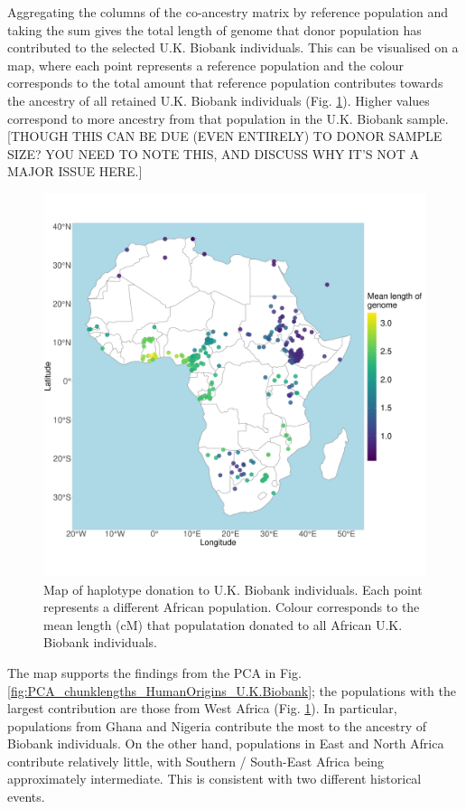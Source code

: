 {Aggregating the columns of the co-ancestry matrix by reference population and taking the sum gives the total length of genome that donor population has contributed to the selected U.K. Biobank individuals. This can be visualised on a map, where each point represents a reference population and the colour corresponds to the total amount that reference population contributes towards the ancestry of all retained U.K. Biobank individuals (Fig. \ref{fig:haplotype_sharing_map_zoomed_II}). Higher values correspond to more ancestry from that population in the U.K. Biobank sample.{\color{red}[THOUGH THIS CAN BE DUE (EVEN ENTIRELY) TO DONOR SAMPLE SIZE? YOU NEED TO NOTE THIS, AND DISCUSS WHY IT'S NOT A MAJOR ISSUE HERE.]} 

\begin{figure}[htp]
    \centering
    \includegraphics[width=1.0\textwidth]{../images/chapter3/haplotype_sharing_map.pdf}
    \caption{Map of haplotype donation to U.K. Biobank individuals. Each point represents a different African population. Colour corresponds to the mean length (cM) that populatation donated to all African U.K. Biobank individuals.}
    \label{fig:haplotype_sharing_map_zoomed_II}
\end{figure}

The map supports the findings from the PCA in Fig. \ref{fig:PCA_chunklengths_HumanOrigins_U.K.Biobank}; the populations with the largest contribution are those from West Africa (Fig. \ref{fig:haplotype_sharing_map_zoomed_II}). In particular, populations from Ghana and Nigeria contribute the most to the ancestry of Biobank individuals. On the other hand, populations in East and North Africa contribute relatively little, with Southern / South-East Africa being approximately intermediate. This is consistent with two different historical events. 

}
